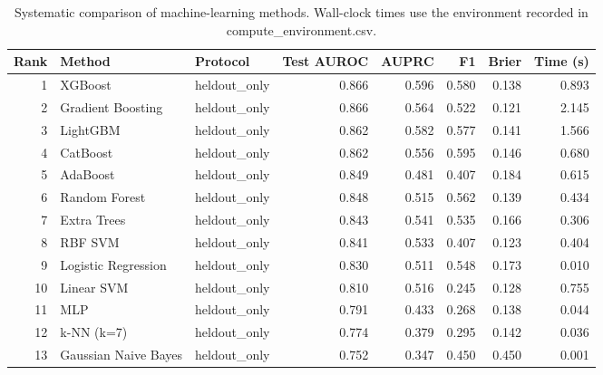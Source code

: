 \begin{table}[htbp]
\centering
\caption{Systematic comparison of machine-learning methods. Wall-clock times use the environment recorded in compute_environment.csv.}
\label{tab:method_comparison_recomputed}
\begin{tabular}{rllrrrrr}
\toprule
Rank & Method & Protocol & Test AUROC & AUPRC & F1 & Brier & Time (s) \\
\midrule
1 & XGBoost & heldout\_only & 0.866 & 0.596 & 0.580 & 0.138 & 0.893 \\
2 & Gradient Boosting & heldout\_only & 0.866 & 0.564 & 0.522 & 0.121 & 2.145 \\
3 & LightGBM & heldout\_only & 0.862 & 0.582 & 0.577 & 0.141 & 1.566 \\
4 & CatBoost & heldout\_only & 0.862 & 0.556 & 0.595 & 0.146 & 0.680 \\
5 & AdaBoost & heldout\_only & 0.849 & 0.481 & 0.407 & 0.184 & 0.615 \\
6 & Random Forest & heldout\_only & 0.848 & 0.515 & 0.562 & 0.139 & 0.434 \\
7 & Extra Trees & heldout\_only & 0.843 & 0.541 & 0.535 & 0.166 & 0.306 \\
8 & RBF SVM & heldout\_only & 0.841 & 0.533 & 0.407 & 0.123 & 0.404 \\
9 & Logistic Regression & heldout\_only & 0.830 & 0.511 & 0.548 & 0.173 & 0.010 \\
10 & Linear SVM & heldout\_only & 0.810 & 0.516 & 0.245 & 0.128 & 0.755 \\
11 & MLP & heldout\_only & 0.791 & 0.433 & 0.268 & 0.138 & 0.044 \\
12 & k-NN (k=7) & heldout\_only & 0.774 & 0.379 & 0.295 & 0.142 & 0.036 \\
13 & Gaussian Naive Bayes & heldout\_only & 0.752 & 0.347 & 0.450 & 0.450 & 0.001 \\
\bottomrule
\end{tabular}

\end{table}
